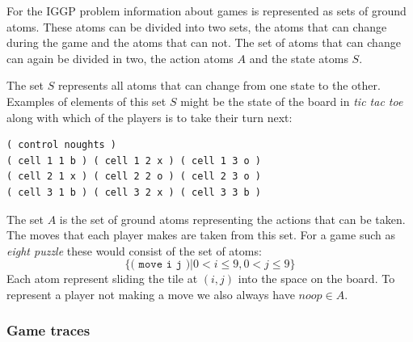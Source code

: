 For the IGGP problem information about games is represented as sets of ground atoms. These atoms can be divided into two sets, the atoms that can change during the game and the atoms that can not. The set of atoms that can change can again be divided in two, the action atoms $A$ and the state atoms $S$.

The set $S$ represents all atoms that can change from one state to the other. Examples of elements of this set $S$ might be the state of the board in \textit{tic tac toe} along with which of the players is to take their turn next:
\begin{verbatim}
( control noughts )
( cell 1 1 b ) ( cell 1 2 x ) ( cell 1 3 o )
( cell 2 1 x ) ( cell 2 2 o ) ( cell 2 3 o )
( cell 3 1 b ) ( cell 3 2 x ) ( cell 3 3 b )
\end{verbatim}

The set $A$ is the set of ground atoms representing the actions that can be taken. The moves that each player makes are taken from this set. For a game such as \textit{eight puzzle} these would consist of the set of atoms:
\[\{\texttt{( move i j )}| 0<i\leq 9, 0<j\leq 9\}\]
Each atom represent sliding the tile at $(i,j)$ into the space on the board. To represent a player not making a move we also always have $noop \in A$.

\subsubsection{Game traces}

